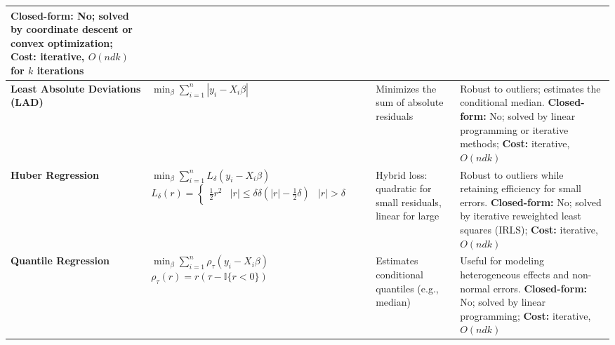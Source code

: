 \documentclass[10pt]{article}
\begin{document}
\begin{longtable}{|>{\bfseries}m{3cm}|m{5cm}|p{3.5cm}|p{8cm}|}
{				\textbf{Closed-form:} No; solved by coordinate descent or convex optimization; \\
				\textbf{Cost:} iterative, $O(ndk)$ for $k$ iterations
				\vspace{4pt}
		} \\
		\hline
		Least Absolute Deviations (LAD) & \parbox{5cm}{
				$\min_{\beta} \sum_{i=1}^n |y_i - X_i\beta|$
		} & \parbox{3.5cm}{\vspace{2pt}Minimizes the sum of absolute residuals} &
		\parbox{8cm}{\vspace{2pt}
				Robust to outliers; estimates the conditional median. \\
				\textbf{Closed-form:} No; solved by linear programming or iterative methods; \\
				\textbf{Cost:} iterative, $O(ndk)$
				\vspace{4pt}
		} \\
		\hline
		Huber Regression & \parbox{5cm}{
				$\min_{\beta} \sum_{i=1}^n L_\delta(y_i - X_i\beta)$ \\
				$L_\delta(r) =
				\begin{cases} \frac{1}{2}r^2 & |r| \leq \delta \\ \delta(|r| - \frac{1}{2}\delta) & |r| > \delta
				\end{cases}$
		} & \parbox{3.5cm}{\vspace{2pt}Hybrid loss: quadratic for small residuals, linear for
		large} & \parbox{8cm}{\vspace{2pt}
				Robust to outliers while retaining efficiency for small errors. \\
				\textbf{Closed-form:} No; solved by iterative reweighted least squares (IRLS); \\
				\textbf{Cost:} iterative, $O(ndk)$
				\vspace{4pt}
		} \\
		\hline
		Quantile Regression & \parbox{5cm}{
				$\min_{\beta} \sum_{i=1}^n \rho_\tau(y_i - X_i\beta)$ \\
				$\rho_\tau(r) = r(\tau - \mathbb{I}\{r < 0\})$
		} & \parbox{3.5cm}{\vspace{2pt}Estimates conditional quantiles (e.g., median)} &
		\parbox{8cm}{\vspace{2pt}
				Useful for modeling heterogeneous effects and non-normal errors. \\
				\textbf{Closed-form:} No; solved by linear programming; \\
				\textbf{Cost:} iterative, $O(ndk)$
				\vspace{4pt}
}
\end{longtable}
\end{document}
